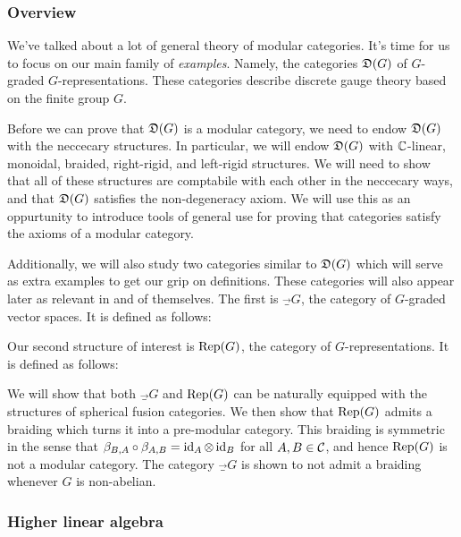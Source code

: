 \subsubsection{Overview}

We've talked about a lot of general theory of modular categories. It's time for us to focus on our main family of \textit{examples}. Namely, the categories ${\mathfrak D}(G)$ of $G$-graded $G$-representations. These categories describe discrete gauge theory based on the finite group $G$.

Before we can prove that ${\mathfrak D}(G)$ is a modular category, we need to endow ${\mathfrak D}(G)$ with the neccecary structures. In particular, we will endow ${\mathfrak D}(G)$ with ${\mathbb C}$-linear, monoidal, braided, right-rigid, and left-rigid structures. We will need to show that all of these structures are comptabile with each other in the neccecary ways, and that ${\mathfrak D}(G)$ satisfies the non-degeneracy axiom. We will use this as an oppurtunity to introduce tools of general use for proving that categories satisfy the axioms of a modular category.

Additionally, we will also study two categories similar to ${\mathfrak D}(G)$ which will serve as extra examples to get our grip on definitions. These categories will also appear later as relevant in and of themselves. The first is $\Vec_G$, the category of $G$-graded vector spaces. It is defined as follows:


Our second structure of interest is $\operatorname{Rep}(G)$, the category of $G$-representations. It is defined as follows:


We will show that both $\Vec_G$ and $\operatorname{Rep}(G)$ can be naturally equipped with the structures of spherical fusion categories. We then show that $\operatorname{Rep}(G)$ admits a braiding which turns it into a pre-modular category. This braiding is symmetric in the sense that $\beta_{B,A}\circ \beta_{A,B}=\operatorname{id}_{A}\otimes \operatorname{id}_{B}$ for all $A,B\in {\mathcal C}$, and hence $\operatorname{Rep}(G)$ is not a modular category. The category $\Vec_G$ is shown to not admit a braiding whenever $G$ is non-abelian.


\subsubsection{Higher linear algebra}


